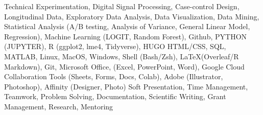 

\begin{cvskills}

\cvskill
    {Technical} %
    {Experimentation, Digital Signal Processing, Case-control Design, Longitudinal Data, Exploratory Data Analysis, Data Visualization, Data Mining, Statistical Analysis (A/B testing, Analysis of Variance, General Linear Model, Regression), Machine Learning (LOGIT, Random Forest), Github, PYTHON (JUPYTER), R (ggplot2, lme4, Tidyverse), HUGO HTML/CSS, SQL, MATLAB, Linux, MacOS, Windows, Shell (Bash/Zsh), \LaTeX (Overleaf/R Markdown), Git, Microsoft Office, (Excel, PowerPoint, Word), Google Cloud Collaboration Tools (Sheets, Forms, Docs, Colab), Adobe (Illustrator, Photoshop), Affinity (Designer, Photo)} %
  \cvskill
    {Soft} %
    {Presentation, Time Management, Teamwork, Problem Solving, Documentation, Scientific Writing, Grant Management, Research, Mentoring} %

\end{cvskills}
